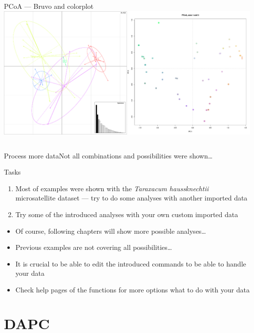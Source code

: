 \documentclass[compress, ucs, xelatex, 11pt, xcolor=svgnames,
  hyperref={
    bookmarks=true,
    unicode=true,
    colorlinks=true,
    pdftitle={Molecular data in R},
    plainpages=false,
    pdfauthor={Vojtech Zeisek},
    pdfsubject={Course about phylogeny and evolution in R},
    pdfcreator={XeLaTeX},
    pdfkeywords={R, evolution, phylogeny, molecular data},
    linkcolor=Tomato,
    anchorcolor=SaddleBrown,
    citecolor=Goldenrod,
    filecolor=DarkMagenta,
    menucolor=Sienna,
    urlcolor=DarkTurquoise,
    pdftex},
  url={hyphens, lowtilde} %
  ]{beamer}
\begin{document}
\begin{frame}{PCoA --- Bruvo and colorplot}
  \includegraphics[width=\textwidth]{pcoa-dalsi.png}
\end{frame}

\subsection{}

\begin{frame}{Process more data}{Not all combinations and possibilities were shown\ldots}
  \begin{block}{Tasks}
    \begin{enumerate}
      \item Most of examples were shown with the \textit{Taraxacum haussknechtii} microsatellite dataset --- try to do some analyses with another imported data
      \item Try some of the introduced analyses with your own custom imported data
    \end{enumerate}
  \end{block}
  \begin{itemize}
    \item Of course, following chapters will show more possible analyses\ldots
    \item Previous examples are not covering all possibilities\ldots
    \item It is crucial to be able to edit the introduced commands to be able to handle your data
    \item Check help pages of the functions for more options what to do with your data
  \end{itemize}
\end{frame}

\section{DAPC}
\end{document}
